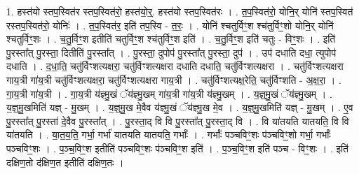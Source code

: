 \documentclass[17pt]{extarticle}
\begin{document}
1. हस्त॑यो स्तप॒स्वित॑र स्तप॒स्वित॑रो॒ हस्त॑यो॒र्॒. हस्त॑यो स्तप॒स्वित॑रः । . त॒प॒स्वित॑रो॒ योनि॒र् योनि॑ स्तप॒स्वित॑ रस्तप॒स्वित॑रो॒ योनिः॑ । . त॒प॒स्वित॑र॒ इति॑ तप॒स्वि - त॒रः॒ । . योनि॑ श्चतुर्विꣳ॒॒श श्च॑तुर्विꣳ॒॒शो योनि॒र् योनि॑ श्चतुर्विꣳ॒॒शः । . च॒तु॒र्विꣳ॒॒श इतीति॑ चतुर्विꣳ॒॒श श्च॑तुर्विꣳ॒॒श इति॑ । . च॒तु॒र्विꣳ॒॒श इति॑ चतुः - विꣳ॒॒शः । . इति॑ पु॒रस्ता᳚त् पु॒रस्ता॒ दितीति॑ पु॒रस्ता᳚त् । . पु॒रस्ता॒ दुपोप॑ पु॒रस्ता᳚त् पु॒रस्ता॒ दुप॑ । . उप॑ दधाति दधा॒ त्युपोप॑ दधाति । . द॒धा॒ति॒ चतु॑र्विꣳशत्यक्षरा॒ चतु॑र्विꣳशत्यक्षरा दधाति दधाति॒ चतु॑र्विꣳशत्यक्षरा । . चतु॑र्विꣳशत्यक्षरा गाय॒त्री गा॑य॒त्री चतु॑र्विꣳशत्यक्षरा॒ चतु॑र्विꣳशत्यक्षरा गाय॒त्री । . चतु॑र्विꣳशत्यक्ष॒रेति॒ चतु॑र्विꣳशति - अ॒क्ष॒रा॒ । . गा॒य॒त्री गा॑य॒त्री । . गा॒य॒त्री य॑ज्ञ्मु॒खं ॅय॑ज्ञ्मु॒खम् गा॑य॒त्री गा॑य॒त्री य॑ज्ञ्मु॒खम् । . य॒ज्ञ्॒मु॒खं ॅय॑ज्ञ्मु॒खम् । . य॒ज्ञ्॒मु॒खमिति॑ यज्ञ् - मु॒खम् । . य॒ज्ञ्॒मु॒ख मे॒वैव य॑ज्ञ्मु॒खं ॅय॑ज्ञ्मु॒ख मे॒व । . य॒ज्ञ्॒मु॒खमिति॑ यज्ञ् - मु॒खम् । . ए॒व पु॒रस्ता᳚त् पु॒रस्ता॑ दे॒वैव पु॒रस्ता᳚त् । . पु॒रस्ता॒द् वि वि पु॒रस्ता᳚त् पु॒रस्ता॒द् वि । . वि या॑तयति यातयति॒ वि वि या॑तयति । . या॒त॒य॒ति॒ गर्भा॒ गर्भा॑ यातयति यातयति॒ गर्भाः᳚ । . गर्भाः᳚ पञ्चविꣳ॒॒शः प॑ञ्चविꣳ॒॒शो गर्भा॒ गर्भाः᳚ पञ्चविꣳ॒॒शः । . प॒ञ्च॒विꣳ॒॒श इतीति॑ पञ्चविꣳ॒॒शः प॑ञ्चविꣳ॒॒श इति॑ । . प॒ञ्च॒विꣳ॒॒श इति॑ पञ्च - विꣳ॒॒शः । . इति॑ दक्षिण॒तो द॑क्षिण॒त इतीति॑ दक्षिण॒तः । \newline
\end{document}
